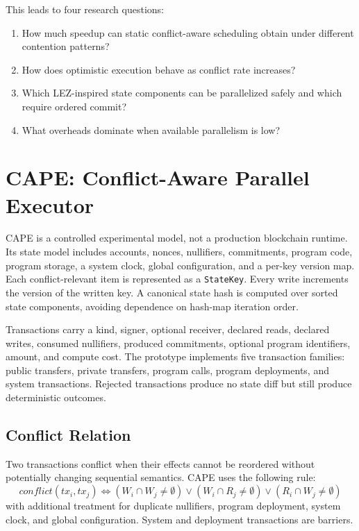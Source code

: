 \documentclass[runningheads]{llncs}
\begin{document}
This leads to four research questions:

\begin{enumerate}
\item How much speedup can static conflict-aware scheduling obtain under different contention patterns?
\item How does optimistic execution behave as conflict rate increases?
\item Which LEZ-inspired state components can be parallelized safely and which require ordered commit?
\item What overheads dominate when available parallelism is low?
\end{enumerate}

\section{CAPE: Conflict-Aware Parallel Executor}

CAPE is a controlled experimental model, not a production blockchain runtime. Its state model includes accounts, nonces, nullifiers, commitments, program code, program storage, a system clock, global configuration, and a per-key version map. Each conflict-relevant item is represented as a \texttt{StateKey}. Every write increments the version of the written key. A canonical state hash is computed over sorted state components, avoiding dependence on hash-map iteration order.

Transactions carry a kind, signer, optional receiver, declared reads, declared writes, consumed nullifiers, produced commitments, optional program identifiers, amount, and compute cost. The prototype implements five transaction families: public transfers, private transfers, program calls, program deployments, and system transactions. Rejected transactions produce no state diff but still produce deterministic outcomes.

\subsection{Conflict Relation}

Two transactions conflict when their effects cannot be reordered without potentially changing sequential semantics. CAPE uses the following rule:
\[
conflict(tx_i, tx_j) \Leftrightarrow
(W_i \cap W_j \neq \emptyset) \lor
(W_i \cap R_j \neq \emptyset) \lor
(R_i \cap W_j \neq \emptyset)
\]
with additional treatment for duplicate nullifiers, program deployment, system clock, and global configuration. System and deployment transactions are barriers.
\end{document}
